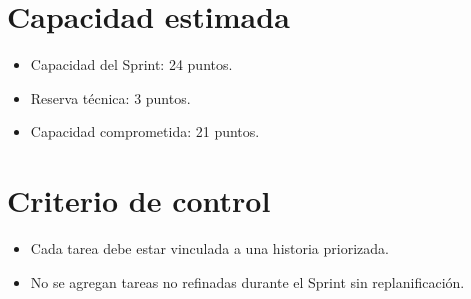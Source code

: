 \documentclass[12pt,a4paper]{article}
\begin{document}
\section{Capacidad estimada}
\begin{itemize}[leftmargin=*]
    \item Capacidad del Sprint: 24 puntos.
    \item Reserva técnica: 3 puntos.
    \item Capacidad comprometida: 21 puntos.
\end{itemize}

\section{Criterio de control}
\begin{itemize}[leftmargin=*]
    \item Cada tarea debe estar vinculada a una historia priorizada.
    \item No se agregan tareas no refinadas durante el Sprint sin replanificación.
\end{itemize}
\end{document}
